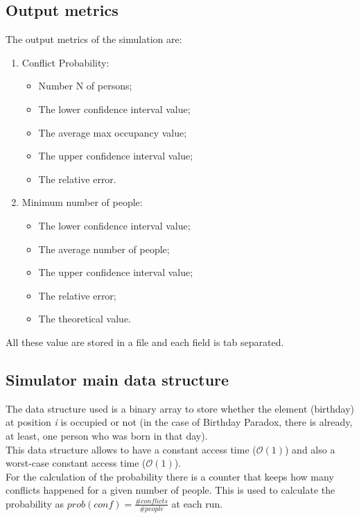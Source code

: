 \documentclass[twocolumn,letterpaper]{report}
\begin{document}
{	\subsection{Output metrics}
			The output metrics of the simulation are:
			\begin{enumerate}
					\item Conflict Probability:
					\begin{itemize}
							\item Number N of persons;
							\item The lower confidence interval value;
							\item The average max occupancy value;
							\item The upper confidence interval value;
							\item The relative error.
					\end{itemize}
					\item Minimum number of people:
					\begin{itemize}
							\item The lower confidence interval value;
							\item The average number of people;
							\item The upper confidence interval value;
							\item The relative error;
							\item The theoretical value.
					\end{itemize}
			\end{enumerate}
			All these value are stored in a file and each field is tab separated.
	
	\subsection{Simulator main data structure}
				The data structure used is a binary array to store whether the element (birthday) at position \emph{i} is occupied or not (in the case of Birthday Paradox, there is already, at least, one person who was born in that day). \\ This data structure allows to have a constant access time ($\mathcal{O}(1)$) and also a worst-case constant access time ($\mathcal{O}(1)$). \\
				For the calculation of the probability there is a counter that keeps how many conflicts happened for a given number of people. This is used to calculate the probability as $prob(conf)=\frac{\#conflicts}{\#people}$ at each run. \\
			
}
\end{document}
